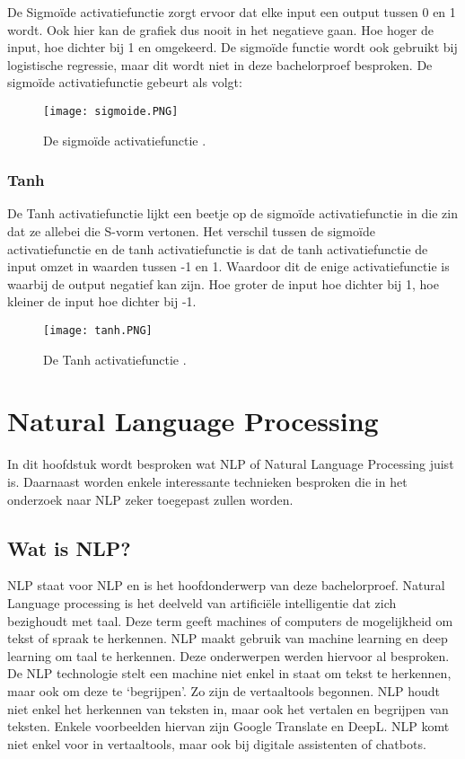 De \gls{Sigmoïde} activatiefunctie zorgt ervoor dat elke input een output tussen 0 en 1 wordt. Ook hier kan de grafiek dus nooit in het negatieve gaan. Hoe hoger de input, hoe dichter bij 1 en omgekeerd. De sigmoïde functie wordt ook gebruikt bij logistische regressie, maar dit wordt niet in deze bachelorproef besproken. \autocite{Brownlee2021} De sigmoïde activatiefunctie gebeurt als volgt:

\begin{figure}[!htbp]
    \texttt{[image: sigmoide.PNG]}
    \caption{\label{sigmoide}De sigmoïde activatiefunctie \autocite{Brownlee2021}.}
\end{figure}
\FloatBarrier


\subsubsection{Tanh}
\label{sec:tanh}

De \gls{Tanh} activatiefunctie lijkt een beetje op de sigmoïde activatiefunctie in die zin dat ze allebei die S-vorm vertonen. Het verschil tussen de sigmoïde activatiefunctie en de tanh activatiefunctie is dat de tanh activatiefunctie de input omzet in waarden tussen -1 en 1. Waardoor dit de enige activatiefunctie is waarbij de output negatief kan zijn. Hoe groter de input hoe dichter bij 1, hoe kleiner de input hoe dichter bij -1. \autocite{Brownlee2021}

\begin{figure}[!htbp]
    \texttt{[image: tanh.PNG]}
    \caption{\label{tanh}De Tanh activatiefunctie \autocite{Brownlee2021}.}
\end{figure}
\FloatBarrier


\section{Natural Language Processing}
\label{sec:NLP}

In dit hoofdstuk wordt besproken wat NLP of Natural Language Processing juist is. Daarnaast worden enkele interessante technieken besproken die in het onderzoek naar NLP zeker toegepast zullen worden. 

\subsection{Wat is NLP?}
\label{sec:WatisNLP}
NLP staat voor \gls{NLP} en is het hoofdonderwerp van deze bachelorproef. Natural Language processing is het deelveld van artificiële intelligentie dat zich bezighoudt met taal. Deze term geeft machines of computers de mogelijkheid om tekst of spraak te herkennen. NLP maakt gebruik van machine learning en deep learning om taal te herkennen. Deze onderwerpen werden hiervoor al besproken. De NLP technologie stelt een machine niet enkel in staat om tekst te herkennen, maar ook om deze te ‘begrijpen’. Zo zijn de vertaaltools begonnen. NLP houdt niet enkel het herkennen van teksten in, maar ook het vertalen en begrijpen van teksten. Enkele voorbeelden hiervan zijn Google Translate en DeepL. NLP komt niet enkel voor in vertaaltools, maar ook bij digitale assistenten of chatbots. \autocite{IBM2020}

